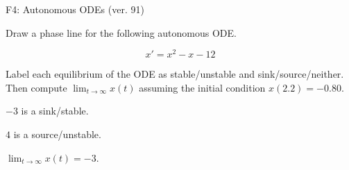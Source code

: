 \begin{exercise}
  \begin{exerciseTitle}F4: Autonomous ODEs (ver. 91)\end{exerciseTitle}
  \begin{exerciseStatement}
    

      Draw a phase line for the following 
      autonomous ODE.
    

    
\[x'= x^{2} - x - 12\]

    

      Label each equilibrium of the ODE
      as stable/unstable and sink/source/neither.
      Then compute \(\lim_{t\to\infty}x(t)\)
      assuming the initial condition
      \(x( 2.2 )= -0.80\).
    

  \end{exerciseStatement}
  \begin{exerciseAnswer}
    

      \(-3\) is a sink/stable.
      
      \(4\) is a source/unstable.
    

    

      \(\lim_{t\to\infty}x(t)=-3\).
    

  \end{exerciseAnswer}
\end{exercise}